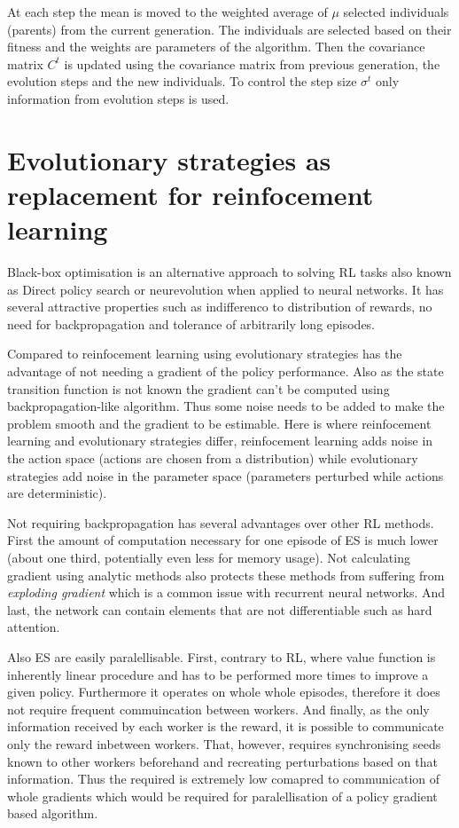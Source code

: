At each step the mean is moved to the weighted average of $\mu$ selected individuals (parents) from the current generation. The individuals are selected based on their fitness and the weights are parameters of the algorithm. Then the covariance matrix $C^t$ is updated using the covariance matrix from previous generation, the evolution steps and the new individuals. To control the step size $\sigma^t$ only information from evolution steps is used.\cite{hansen2016cma}

\section{Evolutionary strategies as replacement for reinfocement learning}
\label{sec:es-reinf}

Black-box optimisation is an alternative approach to solving RL tasks also known as Direct policy search or neurevolution when applied to neural networks. It has several attractive properties such as indifferenco to distribution of rewards, no need for backpropagation and tolerance of arbitrarily long episodes.

Compared to reinfocement learning using evolutionary strategies has the advantage of not needing a gradient of the policy performance. Also as the state transition function is not known  the gradient can't be computed using backpropagation-like algorithm. Thus some noise needs to be added to make the problem smooth and the gradient to be estimable. Here is where reinfocement learning and evolutionary strategies differ, reinfocement learning adds noise in the action space (actions are chosen from a distribution) while evolutionary strategies add noise in the parameter space (parameters perturbed while actions are deterministic).

Not requiring backpropagation has several advantages over other RL methods. First the amount of computation necessary for one episode of ES is much lower (about one third, potentially even less for memory usage). Not calculating gradient using analytic methods also protects these methods from suffering from \emph{exploding gradient} which is a common issue with recurrent neural networks. And last, the network can contain elements that are not differentiable such as hard attention.

Also ES are easily paralellisable. First, contrary to RL, where value function is inherently linear procedure and has to be performed more times to improve a given policy. Furthermore it operates on whole whole episodes, therefore it does not require frequent commuincation between workers. And finally, as the only information received by each worker is the reward, it is possible to communicate only the reward inbetween workers. That, however, requires synchronising seeds known to other workers beforehand and recreating perturbations based on that information. Thus the required is extremely low comapred to communication of whole gradients which would be required for paralellisation of a policy gradient based algorithm.

